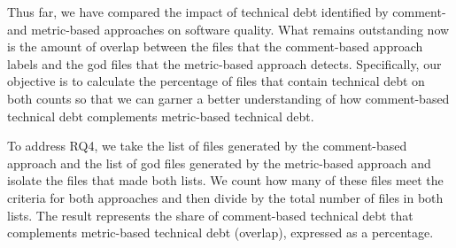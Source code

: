

Thus far, we have compared the impact of technical debt identified by comment- and metric-based approaches on software quality. What remains outstanding now is the amount of overlap between the \SATD files that the comment-based approach labels and the god files that the metric-based approach detects. Specifically, our objective is to calculate the percentage of files that contain technical debt on both counts so that we can garner a better understanding of how comment-based technical debt complements metric-based technical debt.


To address RQ4, we take the list of \SATD files generated by the comment-based approach and the list of god files generated by the metric-based approach and isolate the files that made both lists. We count how many of these files meet the criteria for both approaches and then divide by the total number of files in both lists. The result represents the share of comment-based technical debt that complements metric-based technical debt (overlap), expressed as a percentage.


